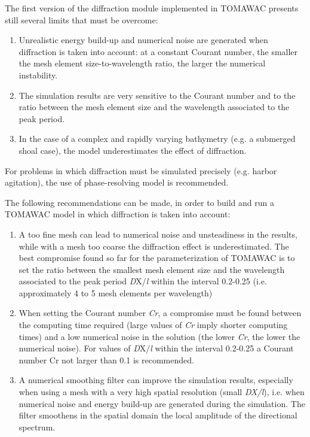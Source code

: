  The first version of the diffraction module implemented in TOMAWAC presents still several limits that must be overcome:

\begin{enumerate}
\item  Unrealistic energy build-up and numerical noise are generated when diffraction is taken into account: at a constant Courant number, the smaller the mesh element size-to-wavelength ratio, the larger the numerical instability.

\item  The simulation results are very sensitive to the Courant number and to the ratio between the mesh element size and the wavelength associated to the peak period.

\item  In the case of a complex and rapidly varying bathymetry (e.g. a submerged shoal case), the model underestimates the effect of diffraction.
\end{enumerate}

 For problems in which diffraction must be simulated precisely (e.g. harbor agitation), the use of phase-resolving model is recommended.

 The following recommendations can be made, in order to build and run a TOMAWAC model in which diffraction is taken into account:

\begin{enumerate}
\item  A too fine mesh can lead to numerical noise and unsteadiness in the results, while with a mesh too coarse the diffraction effect is underestimated. The best compromise found so far for the parameterization of TOMAWAC is to set the ratio between the smallest mesh element size and the wavelength associated to the peak period \textit{D}X/\textit{l} within the interval 0.2-0.25 (i.e. approximately 4 to 5 mesh elements per wavelength)

\item  When setting the Courant number \textit{Cr}, a compromise must be found between the computing time required (large values of \textit{Cr} imply shorter computing times) and a low numerical noise in the solution (the lower \textit{Cr}, the lower the numerical noise). For values of \textit{D}X/\textit{l} within the interval 0.2-0.25 a Courant number Cr not larger than 0.1 is recommended.

\item  A numerical smoothing filter can improve the simulation results, especially when using a mesh with a very high spatial resolution (small \textit{DX/l}), i.e. when numerical noise and energy build-up are generated during the simulation. The filter smoothens in the spatial domain the local amplitude of the directional spectrum.
\end{enumerate}


